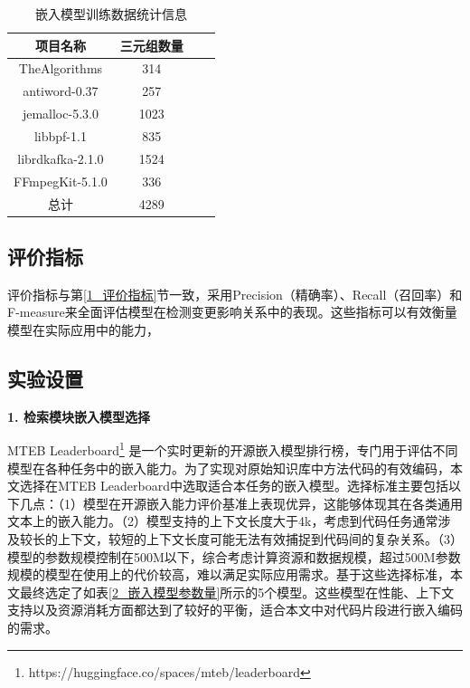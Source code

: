 \begin{table}[htbp]
\caption{嵌入模型训练数据统计信息}
\label{1_数据集统计信息}
\vspace{0.5em}\centering\wuhao
\begin{tabular}{cccc}
\toprule
项目名称 & 三元组数量 \\
\midrule
TheAlgorithms    & 314   \\
antiword-0.37    & 257   \\
jemalloc-5.3.0   & 1023   \\
libbpf-1.1       & 835   \\
librdkafka-2.1.0 & 1524  \\
FFmpegKit-5.1.0  & 336   \\ 
总计              & 4289  \\
\bottomrule
\end{tabular}
\end{table}

\subsection{评价指标} 

评价指标与第\ref{1_评价指标}节一致，采用Precision（精确率）、Recall（召回率）和F-measure来全面评估模型在检测变更影响关系中的表现。这些指标可以有效衡量模型在实际应用中的能力，

\subsection{实验设置}

\noindent \textbf{1. 检索模块嵌入模型选择}

MTEB Leaderboard\footnote{https://huggingface.co/spaces/mteb/leaderboard}\cite{muennighoff2022mteb} 是一个实时更新的开源嵌入模型排行榜，专门用于评估不同模型在各种任务中的嵌入能力。为了实现对原始知识库中方法代码的有效编码，本文选择在MTEB Leaderboard中选取适合本任务的嵌入模型。选择标准主要包括以下几点：（1）模型在开源嵌入能力评价基准上表现优异，这能够体现其在各类通用文本上的嵌入能力。（2）模型支持的上下文长度大于4k，考虑到代码任务通常涉及较长的上下文，较短的上下文长度可能无法有效捕捉到代码间的复杂关系。（3）模型的参数规模控制在500M以下，综合考虑计算资源和数据规模，超过500M参数规模的模型在使用上的代价较高，难以满足实际应用需求。基于这些选择标准，本文最终选定了如表\ref{2_嵌入模型参数量}所示的5个模型\cite{2024mGTE,hu2025kalmembeddingsuperiortrainingdata,sturua2024jinaembeddingsv3multilingualembeddingstask}。这些模型在性能、上下文支持以及资源消耗方面都达到了较好的平衡，适合本文中对代码片段进行嵌入编码的需求。
    
